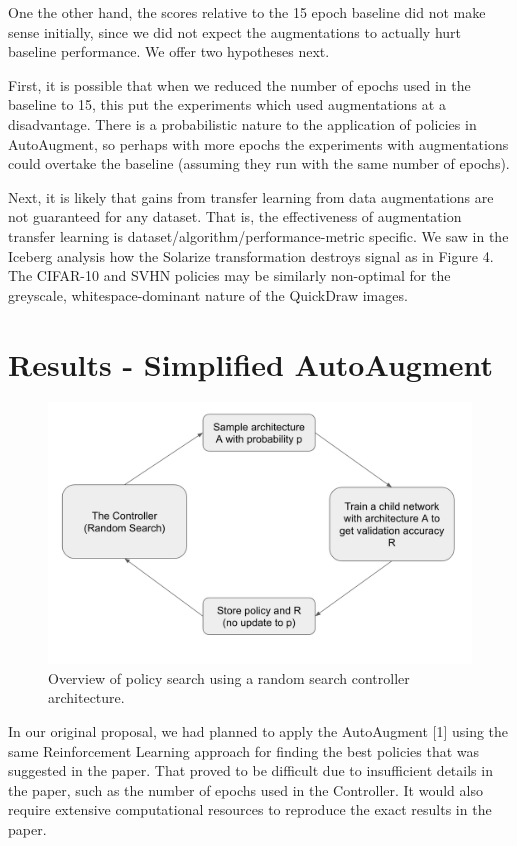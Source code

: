 \documentclass[10pt,twocolumn,letterpaper]{article}
\begin{document}
One the other hand, the scores relative to the 15 epoch baseline did not make sense initially, since we did not expect the augmentations to actually hurt baseline performance.  We offer two hypotheses next.  

First, it is possible that when we reduced the number of epochs used in the baseline to 15, this put the experiments which used augmentations at a disadvantage. There is a probabilistic nature to the application of policies in AutoAugment, so perhaps with more epochs the experiments with augmentations could overtake the baseline (assuming they run with the same number of epochs).

Next, it is likely that gains from transfer learning from data augmentations are not guaranteed for any dataset.  That is, the effectiveness of augmentation transfer learning is dataset/algorithm/performance-metric specific.  We saw in the Iceberg analysis how the Solarize transformation destroys signal as in Figure 4.  The CIFAR-10 and SVHN policies may be similarly non-optimal for the greyscale, whitespace-dominant nature of the QuickDraw images.



\section{Results - Simplified AutoAugment}

\begin{figure}[bhp]
\includegraphics[width=\columnwidth]{random_search_arch.png}
\caption{Overview of policy search using a random search controller architecture.}
\end{figure}

In our original proposal, we had planned to apply the AutoAugment [1] using the same Reinforcement Learning approach for finding the best policies that was suggested in the paper.  That proved to be difficult due to insufficient details in the paper, such as the number of epochs used in the Controller.  It would also require extensive computational resources to reproduce the exact results in the paper.
\end{document}
